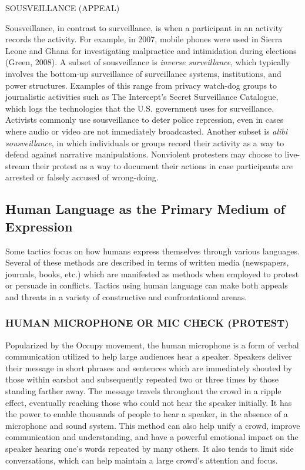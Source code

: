 \documentclass[twoside,a4paper,12pt,fleqn,openany]{extbook}
\begin{document}
SOUSVEILLANCE (APPEAL)

Sousveillance, in contrast to surveillance, is when a participant in an activity records the activity. For example, in 2007, mobile phones were used in Sierra Leone and Ghana for investigating malpractice and intimidation during elections (Green, 2008). A subset of sousveillance is \emph{inverse surveillance}, which typically involves the bottom-up surveillance of surveillance systems, institutions, and power structures. Examples of this range from privacy watch-dog groups to journalistic activities such as The Intercept’s Secret Surveillance Catalogue, which logs the technologies that the U.S. government uses for surveillance. Activists commonly use sousveillance to deter police repression, even in cases where audio or video are not immediately broadcasted. Another subset is \emph{alibi sousveillance}, in which individuals or groups record their activity as a way to defend against narrative manipulations. Nonviolent protesters may choose to live-stream their protest as a way to document their actions in case participants are arrested or falsely accused of wrong-doing.

\subsection*{Human Language as the Primary Medium of Expression}

Some tactics focus on how humans express themselves through various languages. Several of these methods are described in terms of written media (newspapers, journals, books, etc.) which are manifested as methods when employed to protest or persuade in conflicts. Tactics using human language can make both appeals and threats in a variety of constructive and confrontational arenas.

\subsubsection*{HUMAN MICROPHONE OR MIC CHECK (PROTEST)}

Popularized by the Occupy movement, the human microphone is a form of verbal communication utilized to help large audiences hear a speaker. Speakers deliver their message in short phrases and sentences which are immediately shouted by those within earshot and subsequently repeated two or three times by those standing farther away. The message travels throughout the crowd in a ripple effect, eventually reaching those who could not hear the speaker initially. It has the power to enable thousands of people to hear a speaker, in the absence of a microphone and sound system. This method can also help unify a crowd, improve communication and understanding, and have a powerful emotional impact on the speaker hearing one’s words repeated by many others. It also tends to limit side conversations, which can help maintain a large crowd’s attention and focus.
\end{document}
